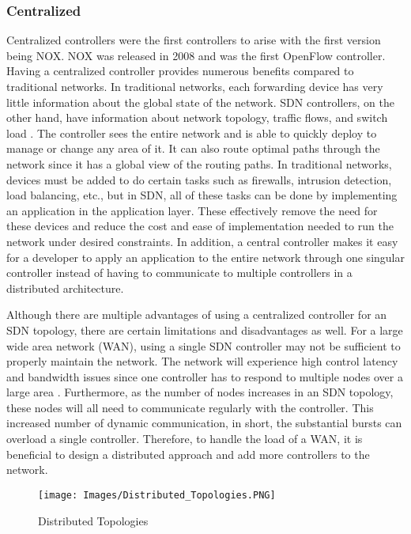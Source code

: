 \documentclass[conference]{IEEEtran}
\begin{document}
\subsubsection{Centralized} Centralized controllers were the first controllers to arise with the first version being NOX\cite{gude2008nox}. NOX was released in 2008 and was the first OpenFlow controller. Having a centralized controller provides numerous benefits compared to traditional networks. In traditional networks, each forwarding device has very little information about the global state of the network. SDN controllers, on the other hand, have information about network topology, traffic flows, and switch load \cite{ahmad2021scalability}. The controller sees the entire network and is able to quickly deploy to manage or change any area of it. It can also route optimal paths through the network since it has a global view of the routing paths. In traditional networks, devices must be added to do certain tasks such as firewalls, intrusion detection, load balancing, etc., but in SDN, all of these tasks can be done by implementing an application  in the application layer\cite{ahmad2021scalability}\cite{chica2020security}. These effectively remove the need for these devices and reduce the cost and ease of implementation needed to run the network under desired constraints. In addition, a central controller makes it easy for a developer to apply an application to the entire network through one singular controller instead of having to communicate to multiple controllers in a distributed architecture. 

Although there are multiple advantages of using a centralized controller for an SDN topology, there are certain limitations and disadvantages as well. For a large wide area network (WAN),  using a single SDN controller may not be sufficient to properly maintain the network. The network will experience high control latency and bandwidth issues since one controller has to respond to multiple nodes over a large area \cite{ahmad2021scalability}. Furthermore, as the number of nodes increases in an SDN topology, these nodes will all need to communicate regularly with the controller. This increased number of dynamic communication, in short, the substantial bursts can overload a single controller. Therefore, to handle the load of a WAN, it is beneficial to design a distributed approach and add more controllers to the network. 

\begin{figure}[h]
\centering
\texttt{[image: Images/Distributed\_Topologies.PNG]}
\caption{Distributed Topologies \cite{haggag2021network}}
\label{Distributed Topologies_APIs}
\end{figure}
\end{document}
